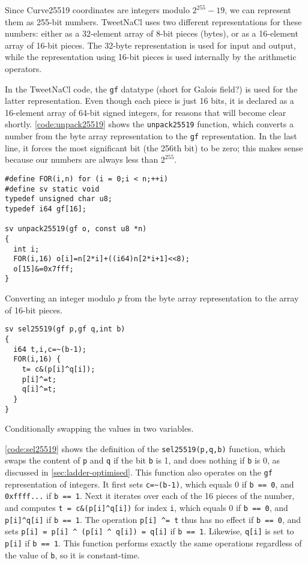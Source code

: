 \documentclass{article}
\begin{document}
Since Curve25519 coordinates are integers modulo $2^{255}-19$, we can represent them as 255-bit numbers.
TweetNaCl uses two different representations for these numbers: either as a 32-element array of 8-bit pieces (bytes), or as a 16-element array of 16-bit pieces.
The 32-byte representation is used for input and output, while the representation using 16-bit pieces is used internally by the arithmetic operators.

In the TweetNaCl code, the \verb|gf| datatype (short for Galois field?) is used for the latter representation.
Even though each piece is just 16 bits, it is declared as a 16-element array of 64-bit signed integers, for reasons that will become clear shortly.
\autoref{code:unpack25519} shows the \verb|unpack25519| function, which converts a number from the byte array representation to the \verb|gf| representation.
In the last line, it forces the most significant bit (the 256th bit) to be zero; this makes sense because our numbers are always less than $2^{255}$.

\begin{listing}
\begin{verbatim}
#define FOR(i,n) for (i = 0;i < n;++i)
#define sv static void
typedef unsigned char u8;
typedef i64 gf[16];

sv unpack25519(gf o, const u8 *n)
{
  int i;
  FOR(i,16) o[i]=n[2*i]+((i64)n[2*i+1]<<8);
  o[15]&=0x7fff;
}
\end{verbatim}
\caption{Converting an integer modulo $p$ from the byte array representation to the array of 16-bit pieces.}\label{code:unpack25519}
\end{listing}

\begin{listing}
\begin{verbatim}
sv sel25519(gf p,gf q,int b)
{
  i64 t,i,c=~(b-1);
  FOR(i,16) {
    t= c&(p[i]^q[i]);
    p[i]^=t;
    q[i]^=t;
  }
}
\end{verbatim}
\caption{Conditionally swapping the values in two variables.}\label{code:sel25519}
\end{listing}

\autoref{code:sel25519} shows the definition of the \verb|sel25519(p,q,b)| function, which swaps the content of \verb|p| and \verb|q| if the bit \verb|b| is 1, and does nothing if \verb|b| is 0, as discussed in \autoref{sec:ladder-optimised}.
This function also operates on the \verb|gf| representation of integers.
It first sets \verb|c=~(b-1)|, which equals 0 if \verb|b == 0|, and \verb|0xffff...| if \verb|b == 1|.
Next it iterates over each of the 16 pieces of the number, and computes \verb|t = c&(p[i]^q[i])| for index \verb|i|, which equals 0 if \verb|b == 0|, and \verb|p[i]^q[i]| if \verb|b == 1|.
The operation \verb|p[i] ^= t| thus has no effect if \verb|b == 0|, and sets \verb|p[i] = p[i] ^ (p[i] ^ q[i]) = q[i]| if \verb|b == 1|.
Likewise, \verb|q[i]| is set to \verb|p[i]| if \verb|b == 1|.
This function performs exactly the same operations regardless of the value of \verb|b|, so it is constant-time.
\end{document}
